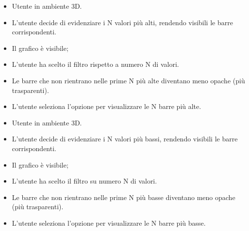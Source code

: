 \UCdsc
{ %
    \begin{itemize}
        \item Utente in ambiente 3D.
    \end{itemize}
}
{ %
    \begin{itemize}
        \item L'utente decide di evidenziare i N valori più alti, rendendo visibili le barre corrispondenti.
    \end{itemize}
}
{ %
    \begin{itemize}
        \item Il grafico è visibile;
        \item L'utente ha scelto il filtro rispetto a numero N di valori.
    \end{itemize}
}
{ %
    \begin{itemize}
        \item Le barre che non rientrano nelle prime N più alte diventano meno opache (più trasparenti).
    \end{itemize}
}
{ %
    \begin{itemize}
        \item L'utente seleziona l'opzione per visualizzare le N barre più alte.
    \end{itemize}
}

\UCdsc
{ %
    \begin{itemize}
        \item Utente in ambiente 3D.
    \end{itemize}
}
{ %
    \begin{itemize}
        \item L'utente decide di evidenziare i N valori più bassi, rendendo visibili le barre corrispondenti.
    \end{itemize}
}
{ %
    \begin{itemize}
        \item Il grafico è visibile;
        \item L'utente ha scelto il filtro su numero N di valori.
    \end{itemize}
}
{ %
    \begin{itemize}
        \item Le barre che non rientrano nelle prime N più basse diventano meno opache (più trasparenti).
    \end{itemize}
}
{ %
    \begin{itemize}
        \item L'utente seleziona l'opzione per visualizzare le N barre più basse.
    \end{itemize}
}

